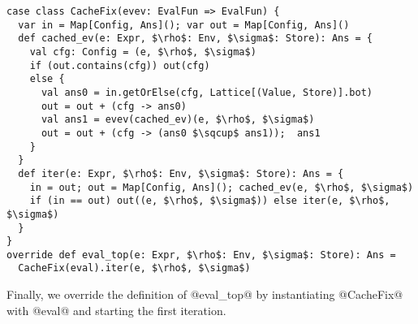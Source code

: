 \begin{lstlisting}
case class CacheFix(evev: EvalFun => EvalFun) {
  var in = Map[Config, Ans](); var out = Map[Config, Ans]()
  def cached_ev(e: Expr, $\rho$: Env, $\sigma$: Store): Ans = {
    val cfg: Config = (e, $\rho$, $\sigma$)
    if (out.contains(cfg)) out(cfg)
    else {
      val ans0 = in.getOrElse(cfg, Lattice[(Value, Store)].bot)
      out = out + (cfg -> ans0)
      val ans1 = evev(cached_ev)(e, $\rho$, $\sigma$)
      out = out + (cfg -> (ans0 $\sqcup$ ans1));  ans1
    }
  }
  def iter(e: Expr, $\rho$: Env, $\sigma$: Store): Ans = {
    in = out; out = Map[Config, Ans](); cached_ev(e, $\rho$, $\sigma$)
    if (in == out) out((e, $\rho$, $\sigma$)) else iter(e, $\rho$, $\sigma$)
  }
}
override def eval_top(e: Expr, $\rho$: Env, $\sigma$: Store): Ans = 
  CacheFix(eval).iter(e, $\rho$, $\sigma$)
\end{lstlisting}

Finally, we override the definition of @eval_top@ by instantiating @CacheFix@ with @eval@ and starting 
the first iteration.
